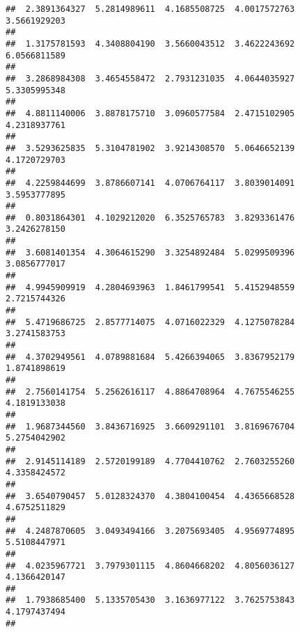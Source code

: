 \documentclass[]{article}
\begin{document}
\begin{verbatim}
##  2.3891364327  5.2814989611  4.1685508725  4.0017572763  3.5661929203 
##                                                                       
##  1.3175781593  4.3408804190  3.5660043512  3.4622243692  6.0566811589 
##                                                                       
##  3.2868984308  3.4654558472  2.7931231035  4.0644035927  5.3305995348 
##                                                                       
##  4.8811140006  3.8878175710  3.0960577584  2.4715102905  4.2318937761 
##                                                                       
##  3.5293625835  5.3104781902  3.9214308570  5.0646652139  4.1720729703 
##                                                                       
##  4.2259844699  3.8786607141  4.0706764117  3.8039014091  3.5953777895 
##                                                                       
##  0.8031864301  4.1029212020  6.3525765783  3.8293361476  3.2426278150 
##                                                                       
##  3.6081401354  4.3064615290  3.3254892484  5.0299509396  3.0856777017 
##                                                                       
##  4.9945909919  4.2804693963  1.8461799541  5.4152948559  2.7215744326 
##                                                                       
##  5.4719686725  2.8577714075  4.0716022329  4.1275078284  3.2741583753 
##                                                                       
##  4.3702949561  4.0789881684  5.4266394065  3.8367952179  1.8741898619 
##                                                                       
##  2.7560141754  5.2562616117  4.8864708964  4.7675546255  4.1819133038 
##                                                                       
##  1.9687344560  3.8436716925  3.6609291101  3.8169676704  5.2754042902 
##                                                                       
##  2.9145114189  2.5720199189  4.7704410762  2.7603255260  4.3358424572 
##                                                                       
##  3.6540790457  5.0128324370  4.3804100454  4.4365668528  4.6752511829 
##                                                                       
##  4.2487870605  3.0493494166  3.2075693405  4.9569774895  5.5108447971 
##                                                                       
##  4.0235967721  3.7979301115  4.8604668202  4.8056036127  4.1366420147 
##                                                                       
##  1.7938685400  5.1335705430  3.1636977122  3.7625753843  4.1797437494 
##                                                                       

\end{verbatim}
\end{document}
